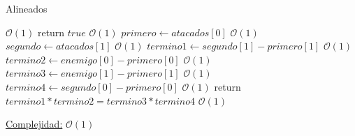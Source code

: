 \documentclass[10pt,a4paper]{article}
\begin{document}
\begin{algorithm}
\caption{Alineados}
\begin{algorithmic}
  	 \Comment $\mathcal{O}(1)$
  		\State return $true$ \Comment $\mathcal{O}(1)$
  	\Else
  		\State $primero \gets atacados[0]$ \Comment $\mathcal{O}(1)$
  		\State $segundo \gets atacados[1]$ \Comment $\mathcal{O}(1)$
  		\State $termino1 \gets segundo[1] - primero[1]$ \Comment $\mathcal{O}(1)$
  		\State $termino2 \gets enemigo[0] - primero[0]$ \Comment $\mathcal{O}(1)$
    		\State $termino3 \gets enemigo[1] - primero[1]$ \Comment $\mathcal{O}(1)$
      	\State $termino4 \gets segundo[0] - primero[0]$ \Comment $\mathcal{O}(1)$
      	\State return $termino1*termino2 = termino3*termino4$ \Comment $\mathcal{O}(1)$ 
  	\EndIf
\EndFunction
\end{algorithmic}
\underline{Complejidad:} $\mathcal{O}(1)$\\
\end{algorithm}
\end{document}
